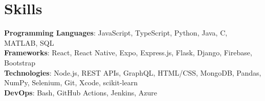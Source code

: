 

\section*{Skills}
	\textbf{Programming Languages}{: JavaScript, TypeScript, Python, Java, C, MATLAB, SQL} \\
	\textbf{Frameworks}{: React, React Native, Expo, Express.js, Flask, Django, Firebase, Bootstrap} \\
	\textbf{Technologies}{: Node.js, REST APIs, GraphQL,  HTML/CSS, MongoDB, Pandas, NumPy, Selenium, Git, Xcode, scikit-learn} \\
	\textbf{DevOps}{: Bash, GitHub Actions, Jenkins, Azure} \\
\vspace{-6.5pt}